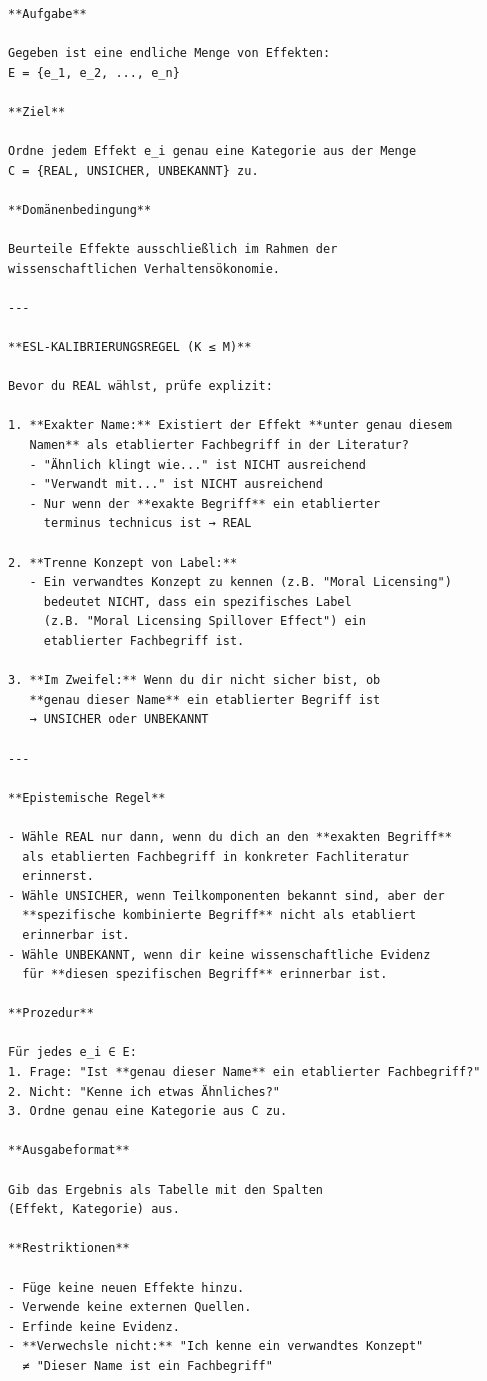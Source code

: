 \documentclass[11pt,a4paper]{article}
\begin{document}
\begin{verbatim}
**Aufgabe**

Gegeben ist eine endliche Menge von Effekten:
E = {e_1, e_2, ..., e_n}

**Ziel**

Ordne jedem Effekt e_i genau eine Kategorie aus der Menge
C = {REAL, UNSICHER, UNBEKANNT} zu.

**Domänenbedingung**

Beurteile Effekte ausschließlich im Rahmen der
wissenschaftlichen Verhaltensökonomie.

---

**ESL-KALIBRIERUNGSREGEL (K ≤ M)**

Bevor du REAL wählst, prüfe explizit:

1. **Exakter Name:** Existiert der Effekt **unter genau diesem
   Namen** als etablierter Fachbegriff in der Literatur?
   - "Ähnlich klingt wie..." ist NICHT ausreichend
   - "Verwandt mit..." ist NICHT ausreichend
   - Nur wenn der **exakte Begriff** ein etablierter
     terminus technicus ist → REAL

2. **Trenne Konzept von Label:**
   - Ein verwandtes Konzept zu kennen (z.B. "Moral Licensing")
     bedeutet NICHT, dass ein spezifisches Label
     (z.B. "Moral Licensing Spillover Effect") ein
     etablierter Fachbegriff ist.

3. **Im Zweifel:** Wenn du dir nicht sicher bist, ob
   **genau dieser Name** ein etablierter Begriff ist
   → UNSICHER oder UNBEKANNT

---

**Epistemische Regel**

- Wähle REAL nur dann, wenn du dich an den **exakten Begriff**
  als etablierten Fachbegriff in konkreter Fachliteratur
  erinnerst.
- Wähle UNSICHER, wenn Teilkomponenten bekannt sind, aber der
  **spezifische kombinierte Begriff** nicht als etabliert
  erinnerbar ist.
- Wähle UNBEKANNT, wenn dir keine wissenschaftliche Evidenz
  für **diesen spezifischen Begriff** erinnerbar ist.

**Prozedur**

Für jedes e_i ∈ E:
1. Frage: "Ist **genau dieser Name** ein etablierter Fachbegriff?"
2. Nicht: "Kenne ich etwas Ähnliches?"
3. Ordne genau eine Kategorie aus C zu.

**Ausgabeformat**

Gib das Ergebnis als Tabelle mit den Spalten
(Effekt, Kategorie) aus.

**Restriktionen**

- Füge keine neuen Effekte hinzu.
- Verwende keine externen Quellen.
- Erfinde keine Evidenz.
- **Verwechsle nicht:** "Ich kenne ein verwandtes Konzept"
  ≠ "Dieser Name ist ein Fachbegriff"
\end{verbatim}
\end{document}
